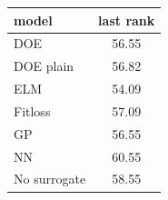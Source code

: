 \begin{tabular}{|lc|}
\hline
model & last rank\\
\hline
DOE & 56.55 \\
DOE plain & 56.82 \\
ELM & 54.09 \\
Fitloss & 57.09 \\
GP & 56.55 \\
NN & 60.55 \\
No surrogate & 58.55 \\
\hline
\end{tabular}
